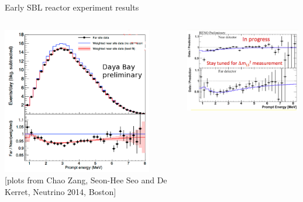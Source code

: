 %
%
%

\begin{frame}{Early SBL reactor experiment results}

\begin{columns}
  \begin{column}{0.60\textwidth}
    \centering
     \includegraphics[width=0.85\textwidth]{./images/3nu/reactor/dayabay_results_spectrum_2014.png}\\
     {\scriptsize \color{blue}[plots from Chao Zang, Seon-Hee Seo and De Kerret, Neutrino 2014, Boston]}
  \end{column}
  \begin{column}{0.40\textwidth}
    \centering
     \includegraphics[width=0.99\textwidth]{./images/3nu/reactor/reno_results_spectrum_2014.png}\\

\end{column}
\end{columns}
\end{frame}
